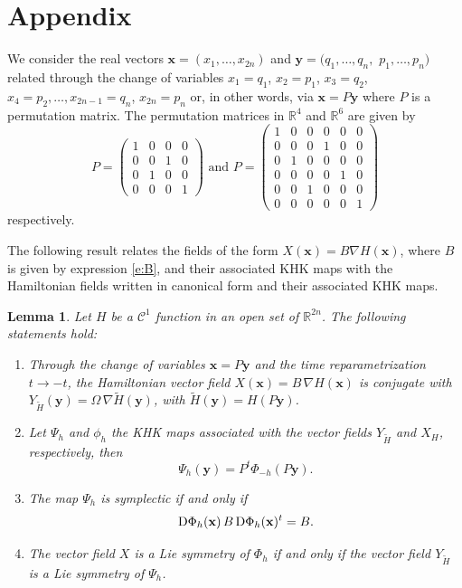 \documentclass[11pt]{article}
\newtheorem {lemma}  [theorem]{Lemma}
\begin{document}
\vfill
\newpage
\appendix



\section{Appendix}\label{s:appendixnou}

We consider the real vectors
$\mathbf{x}=(x_1,\ldots,x_{2n})$ and $\mathbf{y}=(q_1,\ldots,q_{n},$ $p_1,\ldots,p_{n})$ related through the change of variables
$x_1=q_1$, $x_2=p_1$, $x_3=q_2$, $x_4=p_2,\ldots,x_{2n-1}=q_n$, $x_{2n}=p_n$ or, in other words,   via $\mathbf{x}=P\mathbf{y}$ where $P$ is a permutation matrix.
The permutation matrices in $\mathbb{R}^4$ and $\mathbb{R}^6$ are given by
$$
P=\left(\begin{array}{cccc}
1&0&0&0\\
0&0&1&0\\
0&1&0&0\\
0&0&0&1
\end{array}\right)\mbox{ and } P=\left(\begin{array}{cccccc}
1&0&0&0&0&0\\
0&0&0&1&0&0\\
0&1&0&0&0&0\\
0&0&0&0&1&0\\
0&0&1&0&0&0\\
0&0&0&0&0&1
\end{array}\right)
$$
respectively.

The following result relates the fields of the form $X(\mathbf{x})=B\nabla H(\mathbf{x})$, where $B$ is given by expression \eqref{e:B}, and their associated KHK maps with the Hamiltonian fields written in canonical form and their associated KHK maps.

\begin{lemma}\label{l:noulemanou}
Let $H$ be a $\mathcal{C}^1$ function in an open set of $\mathbb{R}^{2n}$. The following statements hold:
\begin{enumerate}
\item[(a)] Through the change of variables $\mathbf{x}=P\mathbf{y}$ and the time reparametrization $t\to-t$, the Hamiltonian vector field $X(\mathbf{x})=B\,\nabla H(\mathbf{x})$ is conjugate with
$Y_{\tilde{H}}(\mathbf{y})=\Omega\,\nabla \tilde{H}(\mathbf{y})$, with $\tilde{H}(\mathbf{y})=H(P\mathbf{y})$.
\item[(b)] Let $\Psi_h$ and $\phi_h$ the KHK maps associated with the vector fields $Y_{\tilde{H}}$ and $X_{H}$, respectively, then
$$
\Psi_h(\mathbf{y})=P^t\Phi_{-h}(P\mathbf{y}).
$$
\item[(c)] The map $\Psi_h$ is symplectic if and only if
$$
{\mathrm D}\Phi_h({\bf{x}})\,B\,{\mathrm D}\Phi_h({\bf{x}})^t=B.
$$
\item[(d)] The vector field $X$ is a Lie symmetry of $\Phi_h$ if and only if the vector field $Y_{\tilde{H}}$ is a Lie symmetry of $\Psi_h$.
\end{enumerate}
\end{lemma}
\end{document}
